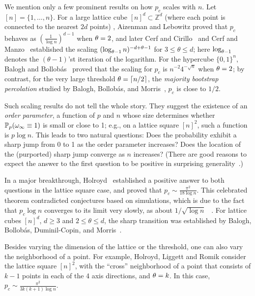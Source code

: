 We mention only a few prominent results on how $p_c$ scales with $n$. Let $[n]=\{1,\dots,n\}$. For a large lattice cube $[n]^d\subset \mathbb{Z}^d$
(where each point is connected to the nearest $2d$ points) , Aizenman and Lebowitz \cite{aizenman} proved that $p_c$ behaves as $(\frac{1}{\log n})^{d-1}$ when $\theta=2$, and later Cerf and Cirillo~\cite{cerfcirillo} and Cerf and Manzo~\cite{cerfmanzo} established the scaling $(\log_{\theta-1} n)^{-d+\theta-1}$ for $3\le \theta\le d$; here $\log_{\theta-1}$ denotes the $(\theta-1)$'st iteration of the logarithm. For the hypercube $\{0,1\}^n$,
 Balogh and Bollob\'as~\cite{BB:2006} proved that the scaling 
for $p_c$ is $n^{-2}4^{-\sqrt n}$ when $\theta=2$; by contrast,  for the very large threshold 
 $\theta=\left\lceil n/2\right \rceil$, the {\it majority bootstrap percolation\/} studied by  Balogh, Bollob\'as, and Morris~\cite{bollobas}, 
$p_c$ is close to $1/2$.

Such scaling results do not tell the whole story. They suggest the existence of an {\it order parameter\/}, a function of $p$ and $n$ whose size determines whether $\mathbb{P}_{p}(\omega_\infty\equiv1)$ is small or close to 1; e.g., on a lattice square $[n]^2$, such a function is $p\log n$. This leads to two natural questions: Does the probability exhibit a sharp jump from 0 to 1 as the order parameter increases? Does the location of the (purported) sharp jump converge as $n$ increases? (There are good reasons to expect the answer to the first question to be positive in surprising generality~\cite{FK:1996}.)

In a major breakthrough, Holroyd~\cite{holroyd} established a positive answer to both questions
in the lattice square case, and proved that $p_c\sim \frac{\pi^2}{18 \log n}$. This celebrated theorem contradicted conjectures based on simulations, which is due to the fact that $p_c\log n$ converges to its limit very slowly, as about $1/\sqrt{\log n}$
~\cite{GGM:2012}. For lattice cubes $[n]^d$, $d\ge 3$ and $2\le \theta\le d$, the sharp transition was established by Balogh, Bollob\'as, Duminil-Copin, and Morris~\cite{bollobas1, bollobas2}.

Besides varying the dimension of the lattice or the threshold, one can also vary the  neighborhood of a point. For example, Holroyd, Liggett and Romik \cite{hlr} consider the lattice square $[n]^2$, with the ``cross'' neighborhood of a point that consists of $k-1$ points in each of the 4 axis directions, and $\theta=k$. In this case, $p_c\sim\frac{\pi^2}{3k(k+1) \log n}$.

